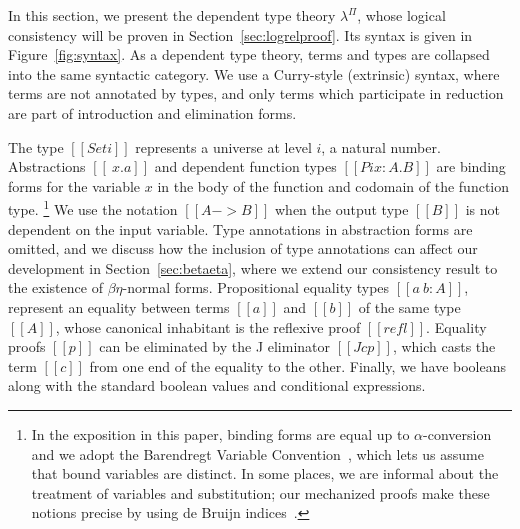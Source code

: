 \documentclass[\ifpublic nolinenum\else\fi,online,OA]{jfp}
\newcommand{\lang}{$\lambda^{\Pi}$\xspace}
\theoremstyle{definition}
\begin{document}
In this section, we present the dependent type theory \lang{}, whose logical
consistency will be proven in Section~\ref{sec:logrelproof}.
Its syntax is given in Figure~\ref{fig:syntax}. As a dependent
type theory, terms and types are collapsed into the same syntactic
category. We use a Curry-style (extrinsic) syntax, where terms are not
annotated by types, and only terms which participate in reduction are part of
introduction and elimination forms.

The type $[[Set i]]$ represents a universe at level $i$,
a natural number. Abstractions $[[ \ x . a ]]$ and
dependent function types $[[Pi x : A . B]]$ are binding forms for the variable
$x$ in the body of the function and codomain of the function type.%
\footnote{In the exposition in this paper, binding forms are equal up to
  $\alpha$-conversion and we adopt the Barendregt Variable
  Convention~\cite{barendregt:lambda-calculus}, which lets us assume that
  bound variables are distinct.  In some places, we are informal about the
  treatment of variables and substitution; our mechanized proofs make these
  notions precise by using de Bruijn indices~\citep{debruijn1994automath}. }
We use the notation $[[A -> B]]$ when the output type $[[B]]$ is not dependent
on the input variable. Type annotations in abstraction forms are omitted, and
we discuss how the inclusion of type annotations can affect
our development in Section~\ref{sec:betaeta}, where we extend our
consistency result to the existence of $\beta\eta$-normal forms.
Propositional equality types $[[a ~ b : A]]$, represent an
equality between terms $[[a]]$ and $[[b]]$ of the same type $[[A]]$, whose
canonical inhabitant is the reflexive proof $[[refl]]$. Equality proofs $[[p]]$
can be eliminated by the J eliminator $[[J c p]]$, which casts the term $[[c]]$
from one end of the equality to the other. Finally, we have booleans along with
the standard boolean values and conditional expressions.
\end{document}
